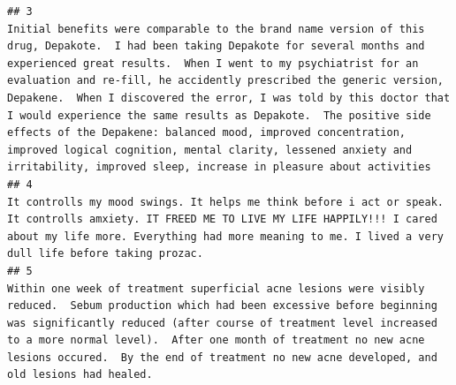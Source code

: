 \documentclass[spanish,]{article}
\begin{document}
\begin{verbatim}
## 3                                                                                                                                                                                                                                                                                                               Initial benefits were comparable to the brand name version of this drug, Depakote.  I had been taking Depakote for several months and experienced great results.  When I went to my psychiatrist for an evaluation and re-fill, he accidently prescribed the generic version, Depakene.  When I discovered the error, I was told by this doctor that I would experience the same results as Depakote.  The positive side effects of the Depakene: balanced mood, improved concentration, improved logical cognition, mental clarity, lessened anxiety and irritability, improved sleep, increase in pleasure about activities
## 4                                                                                                                                                                                                                                                                                                                                                                                                                                                                                                                                                                                                                                                                                            It controlls my mood swings. It helps me think before i act or speak. It controlls amxiety. IT FREED ME TO LIVE MY LIFE HAPPILY!!! I cared about my life more. Everything had more meaning to me. I lived a very dull life before taking prozac.
## 5                                                                                                                                                                                                                                                                                                                                                                                                                                                                                                                                                                Within one week of treatment superficial acne lesions were visibly reduced.  Sebum production which had been excessive before beginning was significantly reduced (after course of treatment level increased to a more normal level).  After one month of treatment no new acne lesions occured.  By the end of treatment no new acne developed, and old lesions had healed.

\end{verbatim}
\end{document}
